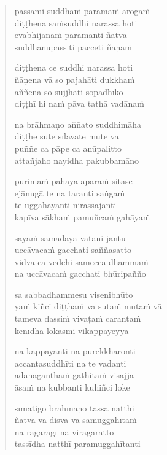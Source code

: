 

\cleartoverso

\vspace*{30mm}

\begin{verse}

passāmi suddhaṁ paramaṁ arogaṁ\\
diṭṭhena saṁsuddhi narassa hoti\\
evābhijānaṁ paramanti ñatvā\\
suddhānupassīti pacceti ñāṇaṁ

diṭṭhena ce suddhi narassa hoti\\
ñāṇena vā so pajahāti dukkhaṁ\\
aññena so sujjhati sopadhīko\\
diṭṭhī hi naṁ pāva tathā vadānaṁ

na brāhmaṇo aññato suddhimāha\\
diṭṭhe sute sīlavate mute vā\\
puññe ca pāpe ca anūpalitto\\
attañjaho nayidha pakubbamāno

purimaṁ pahāya aparaṁ sitāse\\
ejānugā te na taranti saṅgaṁ\\
te uggahāyanti nirassajanti\\
kapīva sākhaṁ pamuñcaṁ gahāyaṁ

sayaṁ samādāya vatāni jantu\\
uccāvacaṁ gacchati saññasatto\\
vidvā ca vedehi samecca dhammaṁ\\
na uccāvacaṁ gacchati bhūripañño

sa sabbadhammesu visenibhūto\\
yaṁ kiñci diṭṭhaṁ va sutaṁ mutaṁ vā\\
tameva dassiṁ vivaṭaṁ carantaṁ\\
kenīdha lokasmi vikappayeyya

na kappayanti na purekkharonti\\
accantasuddhīti na te vadanti\\
ādānaganthaṁ gathitaṁ visajja\\
āsaṁ na kubbanti kuhiñci loke

sīmātigo brāhmaṇo tassa natthi\\
ñatvā va disvā va samuggahītaṁ\\
na rāgarāgī na virāgaratto\\
tassīdha natthī paramuggahītanti

\end{verse}

